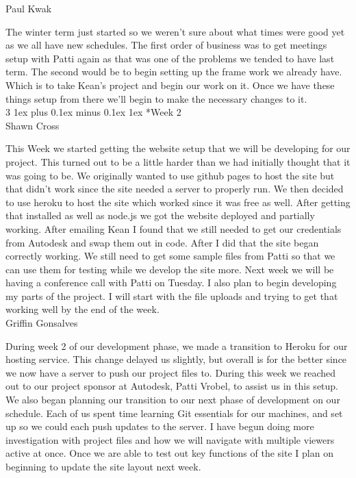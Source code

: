 \documentclass[letterpaper, 10pt, draftclsnofoot, compsoc, onecolumn]{IEEEtran}
\makeatletter
\def\subsubsection{\@startsection{subsubsection}%
                                 {3}%
                                 {\z@}%
                                 {1ex plus 0.1ex minus 0.1ex}%
                                 {1ex}%
                                 {\normalfont\normalsize}}%
\makeatother
\begin{document}
Paul Kwak

The winter term just started so we weren't sure about what times were good yet as we all have new schedules. The first order of business was to get meetings setup with Patti again as that was one of the problems we tended to have last term. The second would be to begin setting up the frame work we already have. Which is to take Kean's project and begin our work on it. Once we have these things setup from there we'll begin to make the necessary changes to it.\\

\subsubsection*{Week 2}\hspace*{\fill} \\
Shawn Cross

This Week we started getting the website setup that we will be developing for our project. This turned out to be a little harder than we had initially thought that it was going to be. We originally wanted to use github pages to host the site but that didn't work since the site needed a server to properly run. We then decided to use heroku to host the site which worked since it was free as well. After getting that installed as well as node.js we got the website deployed and partially working. After emailing Kean I found that we still needed to get our credentials from Autodesk and swap them out in code. After I did that the site began correctly working. We still need to get some sample files from Patti so that we can use them for testing while we develop the site more. Next week we will be having a conference call with Patti on Tuesday. I also plan to begin developing my parts of the project. I will start with the file uploads and trying to get that working well by the end of the week.\\

Griffin Gonsalves

During week 2 of our development phase, we made a transition to Heroku for our hosting service. This change delayed us slightly, but overall is for the better since we now have a server to push our project files to. During this week we reached out to our project sponsor at Autodesk, Patti Vrobel, to assist us in this setup. We also began planning our transition to our next phase of development on our schedule. Each of us spent time learning Git essentials for our machines, and set up so we could each push updates to the server. I have begun doing more investigation with project files and how we will navigate with multiple viewers active at once. Once we are able to test out key functions of the site I plan on beginning to update the site layout next week.\\
\end{document}
